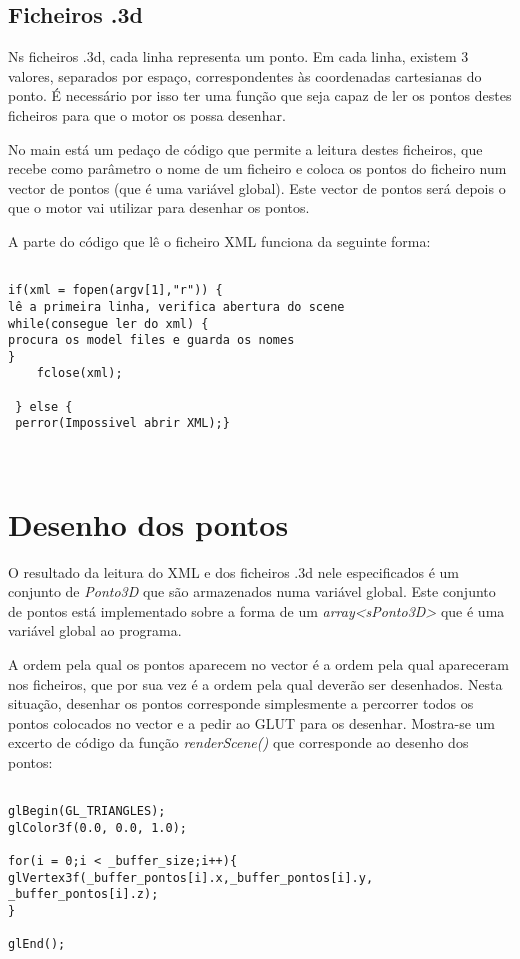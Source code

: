\subsection{Ficheiros .3d}


Ns ficheiros .3d, cada linha representa um ponto. Em cada linha, existem 3 valores, separados por espaço, correspondentes às coordenadas cartesianas do ponto. É necessário por isso ter uma função que seja capaz de ler os pontos destes ficheiros para que o motor os possa desenhar.

No main está um pedaço de código que permite a leitura destes ficheiros, que recebe como parâmetro o nome de um ficheiro e coloca os pontos do ficheiro num vector de pontos (que é uma variável global). Este vector de pontos será depois o que o motor vai utilizar para desenhar os pontos.

A parte do código que lê o ficheiro XML funciona da seguinte forma:

\begin{Verbatim}

if(xml = fopen(argv[1],"r")) {
lê a primeira linha, verifica abertura do scene
while(consegue ler do xml) {
procura os model files e guarda os nomes 
}
	fclose(xml);

 } else {
 perror(Impossivel abrir XML);}
 
 
\end{Verbatim}

\section{Desenho dos pontos}

O resultado da leitura do XML e dos ficheiros .3d nele especificados é um conjunto de \textit{Ponto3D} que são armazenados numa variável global. Este conjunto de pontos está implementado sobre a forma de um \textit{array<sPonto3D>} que é uma variável global ao programa.

A ordem pela qual os pontos aparecem no vector é a ordem pela qual apareceram nos ficheiros, que por sua vez é a ordem pela qual deverão ser desenhados. Nesta situação, desenhar os pontos corresponde simplesmente a percorrer todos os pontos colocados no vector e a pedir ao GLUT para os desenhar. Mostra-se um excerto de código da função \textit{renderScene()} que corresponde ao desenho dos pontos:

\begin{Verbatim}

glBegin(GL_TRIANGLES);
glColor3f(0.0, 0.0, 1.0);

for(i = 0;i < _buffer_size;i++){
glVertex3f(_buffer_pontos[i].x,_buffer_pontos[i].y,
_buffer_pontos[i].z);
}

glEnd();
\end{Verbatim}

